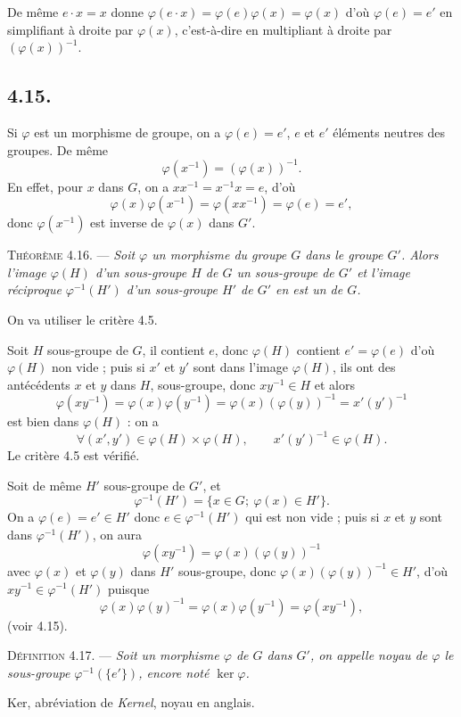 De même $e\cdot x=x$ donne $\varphi(e\cdot x)=\varphi(e)\varphi(x)=\varphi(x)$ d'où $\varphi(e)=e'$ en simplifiant à droite par $\varphi(x)$, c'est-à-dire en multipliant à droite par $(\varphi(x))^{-1}$.

\subsection*{4.15.}
Si $\varphi$ est un morphisme de groupe, on a $\varphi(e)=e'$, $e$ et $e'$ éléments neutres des groupes. De même
\[
\varphi(x^{-1})=(\varphi(x))^{-1}.
\]
En effet, pour $x$ dans $G$, on a $xx^{-1}=x^{-1}x=e$, d'où
\[
\varphi(x)\varphi(x^{-1})=\varphi(xx^{-1})=\varphi(e)=e',
\]
donc $\varphi(x^{-1})$ est inverse de $\varphi(x)$ dans $G'$.

\medskip\noindent\textsc{Théorème 4.16.} --- \emph{Soit $\varphi$ un morphisme du groupe $G$ dans le groupe $G'$. Alors l'image $\varphi(H)$ d'un sous-groupe $H$ de $G$  un sous-groupe de $G'$ et l'image réciproque $\varphi^{-1}(H')$ d'un sous-groupe $H'$ de $G'$ en est un de $G$.}

On va utiliser le critère 4.5.

Soit $H$ sous-groupe de $G$, il contient $e$, donc $\varphi(H)$ contient $e'=\varphi(e)$ d'où $\varphi(H)$ non vide ; puis si $x'$ et $y'$ sont dans l'image $\varphi(H)$, ils ont des antécédents $x$ et $y$ dans $H$, sous-groupe, donc $xy^{-1}\in H$ et alors
\[
\varphi(xy^{-1})=\varphi(x)\varphi(y^{-1})
=\varphi(x)(\varphi(y))^{-1}=x'(y')^{-1}
\]
est bien dans $\varphi(H)$ : on a
\[
\forall(x',y')\in\varphi(H)\times\varphi(H),\qquad x'(y')^{-1}\in\varphi(H).
\]
Le critère 4.5 est vérifié.

Soit de même $H'$ sous-groupe de $G'$, et
\[
\varphi^{-1}(H')=\{x\in G;\ \varphi(x)\in H'\}.
\]
On a $\varphi(e)=e'\in H'$ donc $e\in\varphi^{-1}(H')$ qui est non vide ; puis si $x$ et $y$ sont dans $\varphi^{-1}(H')$, on aura
\[
\varphi(xy^{-1})=\varphi(x)(\varphi(y))^{-1}
\]
avec $\varphi(x)$ et $\varphi(y)$ dans $H'$ sous-groupe, donc $\varphi(x)(\varphi(y))^{-1}\in H'$, d'où $xy^{-1}\in\varphi^{-1}(H')$ puisque
\[
\varphi(x)\varphi(y)^{-1}=\varphi(x)\varphi(y^{-1})=\varphi(xy^{-1}),
\]
(voir 4.15). \bookend

\medskip\noindent\textsc{Définition 4.17.} --- \emph{Soit un morphisme $\varphi$ de $G$ dans $G'$, on appelle noyau de $\varphi$ le sous-groupe $\varphi^{-1}(\{e'\})$, encore noté $\ker\varphi$.}

Ker, abréviation de \emph{Kernel}, noyau en anglais.

